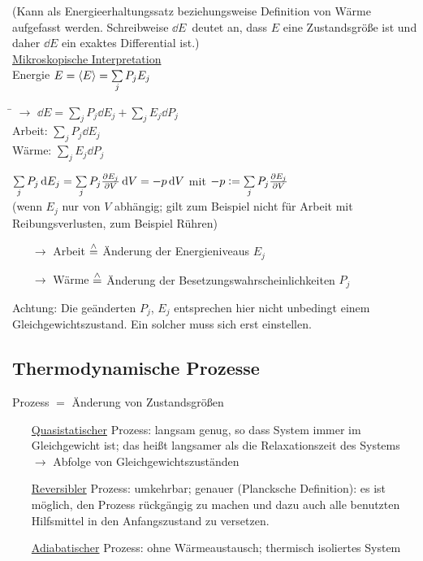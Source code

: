 (Kann als Energieerhaltungssatz beziehungsweise Definition von Wärme aufgefasst werden. Schreibweise \glqq$\dd{E}$\grqq\ deutet an, dass $E$ eine Zustandsgröße ist und daher $\dd{E}$ ein exaktes Differential ist.)\\
\uline{Mikroskopische Interpretation}\\
Energie $E = \left\langle E \right\rangle = \sum\limits_j P_j E_j$
\begin{tabbing}
\hspace{4em} \= \kill
$\rightarrow$\> $\dd{E} = \sum\limits_j P_j \dd{E_j} + \sum\limits_j E_j \dd{P_j}$\\
Arbeit: \> $\sum\limits_j P_j \dd{E_j}$\\
Wärme: \> $\sum\limits_jE_j \dd{P_j}$
\end{tabbing}
$\sum\limits_j P_j \,\text d{E_j} = \sum\limits_j P_j \frac{\partial E_j}{\partial V} \,\text d{V} = - p \,\text d{V}$ mit $-p \vcentcolon = \sum\limits_j P_j \frac{\partial E_j}{\partial V}$\\
(wenn $E_j$ nur von $V$ abhängig; gilt zum Beispiel nicht für Arbeit mit Reibungsverlusten, zum Beispiel Rühren)
\begin{itemize}[align=left, labelwidth=6em, labelsep=1ex, labelindent=0pt, leftmargin=++, listparindent=\leftmargin]
\item[$\rightarrow$ Arbeit] $\stackrel{\wedge}{=}$ Änderung der Energieniveaus $E_j$
\item[$\rightarrow$ Wärme] $\stackrel{\wedge}{=}$ Änderung der Besetzungswahrscheinlichkeiten $P_j$
\end{itemize}
Achtung: Die geänderten $P_j$, $E_j$ entsprechen hier nicht unbedingt einem Gleichgewichtszustand. Ein solcher muss sich erst einstellen.

\subsection{Thermodynamische Prozesse}
Prozess $=$ Änderung von Zustandsgrößen

\begin{itemize}[align=left, labelwidth=, labelsep=1ex, labelindent=0pt, leftmargin=++, listparindent=\leftmargin]
\item[\uline{Quasistatischer} Prozess:] langsam genug, so dass System immer im Gleichgewicht ist; das heißt langsamer als die Relaxationszeit des Systems\\
$\rightarrow$ Abfolge von Gleichgewichtszuständen
\item[\uline{Reversibler} Prozess:] umkehrbar; genauer (Plancksche Definition): es ist möglich, den Prozess rück\-gängig zu machen und dazu auch alle benutzten Hilfsmittel in den Anfangszustand zu versetzen.
\item[\uline{Adiabatischer} Prozess:] ohne Wärmeaustausch; thermisch isoliertes System
\end{itemize}

